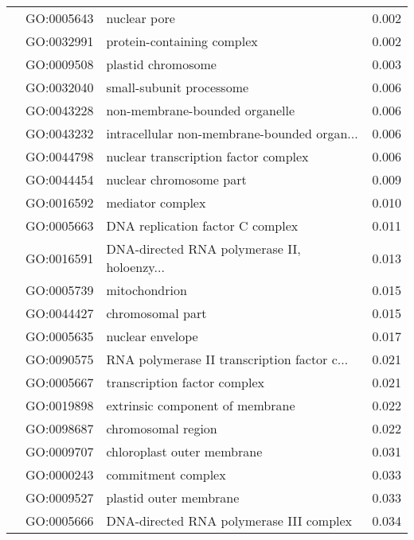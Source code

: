 \begin{longtable}{lllr}
   & GO:0005643 &                                 nuclear pore &         0.002 \\
   & GO:0032991 &                   protein-containing complex &         0.002 \\
   & GO:0009508 &                           plastid chromosome &         0.003 \\
   & GO:0032040 &                     small-subunit processome &         0.006 \\
   & GO:0043228 &               non-membrane-bounded organelle &         0.006 \\
   & GO:0043232 &  intracellular non-membrane-bounded organ... &         0.006 \\
   & GO:0044798 &         nuclear transcription factor complex &         0.006 \\
   & GO:0044454 &                      nuclear chromosome part &         0.009 \\
   & GO:0016592 &                             mediator complex &         0.010 \\
   & GO:0005663 &             DNA replication factor C complex &         0.011 \\
   & GO:0016591 &  DNA-directed RNA polymerase II, holoenzy... &         0.013 \\
   & GO:0005739 &                                mitochondrion &         0.015 \\
   & GO:0044427 &                             chromosomal part &         0.015 \\
   & GO:0005635 &                             nuclear envelope &         0.017 \\
   & GO:0090575 &  RNA polymerase II transcription factor c... &         0.021 \\
   & GO:0005667 &                 transcription factor complex &         0.021 \\
   & GO:0019898 &              extrinsic component of membrane &         0.022 \\
   & GO:0098687 &                           chromosomal region &         0.022 \\
   & GO:0009707 &                   chloroplast outer membrane &         0.031 \\
   & GO:0000243 &                           commitment complex &         0.033 \\
   & GO:0009527 &                       plastid outer membrane &         0.033 \\
   & GO:0005666 &      DNA-directed RNA polymerase III complex &         0.034 \\

\end{longtable}
